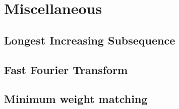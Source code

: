 \documentclass[a4paper,11pt]{article}
\begin{document}
\section{Miscellaneous}
  \subsection{Longest Increasing Subsequence}
        
    
  \subsection{Fast Fourier Transform}
    

  \subsection{Minimum weight matching}
    
\end{document}
